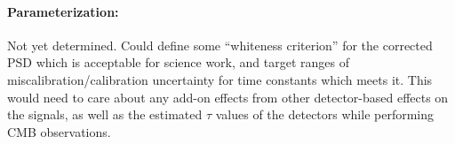 \paragraph{Parameterization:}
Not yet determined. Could define some ``whiteness criterion'' for the corrected PSD which is acceptable for science work, and target ranges of miscalibration/calibration uncertainty for time constants which meets it. This would need to care about any add-on effects from other detector-based effects on the signals, as well as the estimated $\tau$ values of the detectors while performing CMB observations.